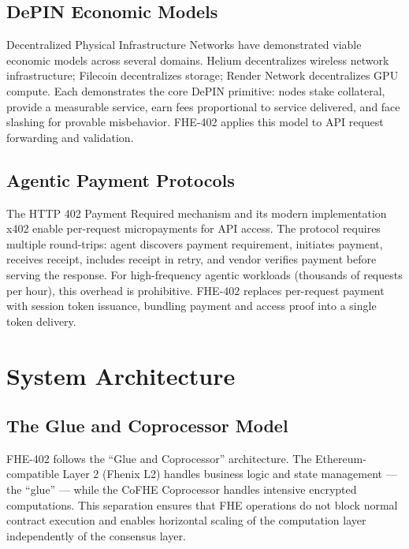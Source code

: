 \documentclass[conference]{IEEEtran}
\begin{document}
\subsection{DePIN Economic Models}
Decentralized Physical Infrastructure Networks have demonstrated viable economic models
across several domains. Helium \cite{helium} decentralizes wireless network infrastructure;
Filecoin \cite{filecoin} decentralizes storage; Render Network \cite{render} decentralizes
GPU compute. Each demonstrates the core DePIN primitive: nodes stake collateral, provide
a measurable service, earn fees proportional to service delivered, and face slashing for
provable misbehavior. FHE-402 applies this model to API request forwarding and validation.

\subsection{Agentic Payment Protocols}
The HTTP 402 Payment Required mechanism and its modern implementation x402 \cite{x402}
enable per-request micropayments for API access. The protocol requires multiple round-trips:
agent discovers payment requirement, initiates payment, receives receipt, includes receipt
in retry, and vendor verifies payment before serving the response. For high-frequency
agentic workloads (thousands of requests per hour), this overhead is prohibitive. FHE-402
replaces per-request payment with session token issuance, bundling payment and access
proof into a single token delivery.

\section{System Architecture}
\label{sec:arch}

\subsection{The Glue and Coprocessor Model}

FHE-402 follows the ``Glue and Coprocessor'' architecture. The Ethereum-compatible
Layer 2 (Fhenix L2) handles business logic and state management --- the ``glue'' ---
while the CoFHE Coprocessor handles intensive encrypted computations. This separation
ensures that FHE operations do not block normal contract execution and enables
horizontal scaling of the computation layer independently of the consensus layer.
\end{document}
